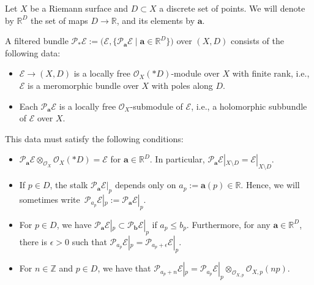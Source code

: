 Let $X$ be a Riemann surface and $D\subset X$ a discrete set of points. We will denote by $\mathbb{R}^D$ the set of maps $D\to \mathbb{R}$, and its elements by $\boldsymbol{a}$.
\begin{Definition} \label{deffilt} A filtered bundle $\mathcal{P}_*\mathcal{E}:=\bigl(\mathcal{E},\bigl\{\mathcal{P}_{\boldsymbol{a}}\mathcal{E} \mid \boldsymbol{a}\in \mathbb{R}^{D} \bigr\}\bigr)$ over $(X,D)$ consists of the following data:
\begin{itemize}\itemsep=0pt
 \item $\mathcal{E}\to (X,D)$ is a locally free $\mathcal{O}_{X}(*D)$-module over $X$ with finite rank, i.e., $\mathcal{E}$ is a meromorphic bundle over $X$ with poles along $D$.
 \item Each $\mathcal{P}_{\boldsymbol{a}}\mathcal{E}$ is a locally free $\mathcal{O}_{X}$-submodule of $\mathcal{E}$, i.e., a holomorphic subbundle of $\mathcal{E}$ over $X$.
\end{itemize}
This data must satisfy the following conditions:
\begin{itemize}\itemsep=0pt
 \item $\mathcal{P}_{\boldsymbol{a}}\mathcal{E}\otimes_{\mathcal{O}_X}\mathcal{O}_{X}(*D)=\mathcal{E}$ for $\boldsymbol{a}\in \mathbb{R}^D$. In particular, $\mathcal{P}_{\boldsymbol{a}}\mathcal{E}|_{X\setminus D}=\mathcal{E}|_{X\setminus D}$.
 \item If $p\in D$, the stalk $\mathcal{P}_{\boldsymbol{a}}\mathcal{E}|_p$ depends only on $a_p:=\boldsymbol{a}(p)\in \mathbb{R}$. Hence, we will sometimes write~${\mathcal{P}_{a_p}\mathcal{E}|_p:=\mathcal{P}_{\boldsymbol{a}}\mathcal{E}|_p}$.
 \item For $p \in D$, we have $\mathcal{P}_{\boldsymbol{a}}\mathcal{E}|_p\subset \mathcal{P}_{\boldsymbol{b}}\mathcal{E}|_p$ if $a_p\leq b_p$. Furthermore, for any $\boldsymbol{a} \in \mathbb{R}^D$, there is $\epsilon>0$ such that $\mathcal{P}_{a_p}\mathcal{E}|_p=\mathcal{P}_{a_p+\epsilon}\mathcal{E}|_p$.
 \item For $n \in \mathbb{Z}$ and $p \in D$, we have that $\mathcal{P}_{a_p+n}\mathcal{E}|_p=\mathcal{P}_{a_p}\mathcal{E}|_p\otimes_{\mathcal{O}_{X,p}} \mathcal{O}_{X,p}(np)$.
\end{itemize}
\end{Definition}

